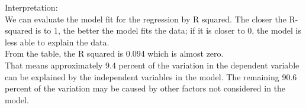 \documentclass[12pt,letterpaper]{article}
\begin{document}
\begin{enumerate}
	Interpretation:\\
	We can evaluate the model fit for the regression by R squared. The closer the R-squared is to 1, the better the model fits the data; if it is closer to 0, the model is less able to explain the data.\\
	
	From the table, the R squared is 0.094 which is almost zero.\\
	
	That means approximately 9.4 percent of the variation in the dependent variable can be explained by the independent variables in the model. The remaining 90.6 percent of the variation may be caused by other factors not considered in the model. 
\end{enumerate}  
\end{document}
